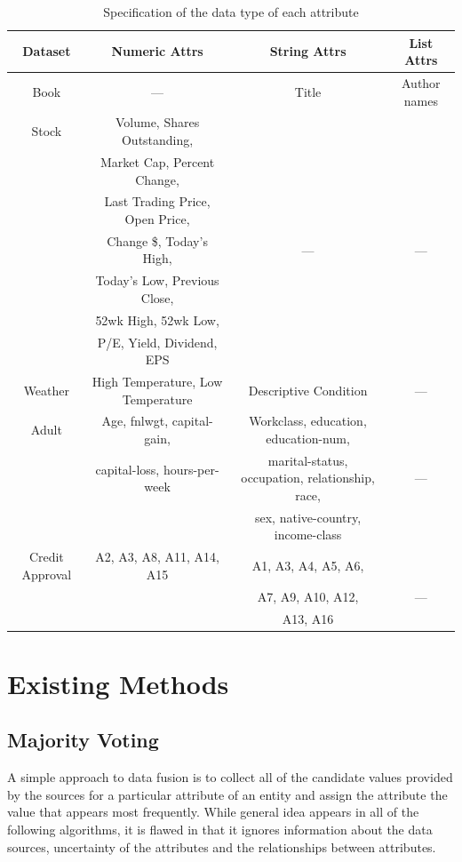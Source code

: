 \documentclass{acm_proc_article-sp}
\begin{document}
\begin{table}[t]
\small
\centering
\begin{tabular}{|c|c|c|c|}
\hline
\textbf{Dataset} & \bf Numeric Attrs & \bf  String Attrs & \bf List Attrs\\
\hline
Book & ---  & Title &Author names \\
\hline
Stock & Volume, Shares Outstanding, &   &  \\
& Market Cap, Percent Change, & & \\
&  Last Trading Price, Open Price, && \\
& Change \$, Today's High, & ---  & --- \\
& Today's Low, Previous Close, && \\
& 52wk High, 52wk Low, && \\
& P/E, Yield, Dividend, EPS & & \\
\hline
Weather &  High Temperature, Low Temperature & Descriptive Condition & ---  \\
\hline
Adult & Age, fnlwgt, capital-gain, & Workclass, education, education-num, &   \\
& capital-loss, hours-per-week & marital-status, occupation, relationship, race, & ---\\
& & sex, native-country, income-class & \\
\hline
Credit Approval &  A2, A3, A8, A11, A14, A15 & A1, A3, A4, A5, A6,  & \\
& & A7, A9, A10, A12,  & ---  \\
& & A13, A16  & \\
\hline
\end{tabular}
\caption{Specification of the data type of each attribute}
\label{fig:datatype} 
\end{table}


\section{Existing Methods}

\subsection{Majority Voting}

A simple approach to data fusion is to collect all of the candidate values provided by the sources for a particular attribute of an entity and assign the attribute the value that appears most frequently. While general idea appears in all of the following   algorithms,  it is flawed in that it ignores information about the data sources, uncertainty of the attributes and the relationships between  attributes.
\end{document}
